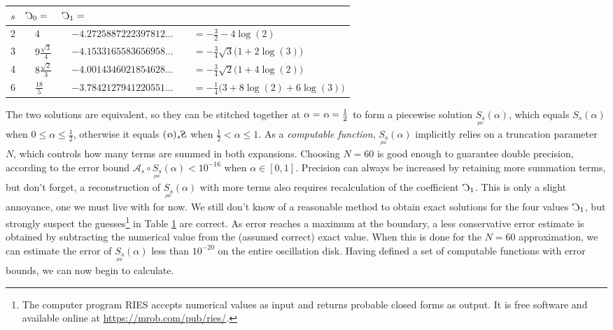 \documentclass[nofootinbib,preprint]{revtex4-1}
\newcommand{\rev}[1]{\text{\reflectbox{$#1$}}}
\begin{document}
\begin{table}[t]
\begin{center}
\label{tab:InitDat}
\begin{tabularx}{0.9 \textwidth}{ c |  c l | c l  c l }
\hline \hline
 \;\;\;$s$\;\;\;&\multicolumn{2}{l|}{ \; $\rev{C}_0=$} & \multicolumn{2}{l}{\; $\rev{C}_1=$} 
 &  \\
\hline
2 &\;\;\;\;& $4$ & \;\;\;\; 
         & $-4.2725887222397812\ldots$ &  & $ = -\frac{3}{2} - 4 \log(2)$   \\
3 &\;\;\;& $9\frac{\sqrt{3}}{4}$ \hspace{0.5cm} & \;\;\; 
         & $-4.1533165583656958\ldots$ &  & $ = -\frac{3}{4}\sqrt{3}\big(1+2\log(3)\big)$   \\
4 &\;\;\;& $8\frac{\sqrt{2}}{3}$ & \;\;\; 
         & $-4.0014346021854628\ldots$ &  & $ = -\frac{3}{4}\sqrt{2}\big(1+4\log(2)\big)$   \\
6 &\;\;\;& $\frac{18}{5}$ & \;\;\; 
         & $-3.7842127941220551\ldots$ & \;\;\;\; & $ = - \frac{1}{4}\big(3+8\log(2)+6\log(3)\big)$
\\ \hline
\end{tabularx}
\end{center}
\end{table}

The two solutions are equivalent, so they can be stitched together at $\alpha=\rev{\alpha}=\frac{1}{2}$ 
to form a piecewise solution $\underset{^{pw}}{S_s}(\alpha)$, which equals $S_s(\alpha)$ 
when $0 \le \alpha \le \frac{1}{2}$, otherwise it equals $\rev{S_s(\alpha)}$ when 
$\frac{1}{2}<\alpha \le 1$. As a \textit{computable function}, $\underset{^{pw}}{S_s}(\alpha)$ 
implicitly relies on a truncation parameter $N$, which controls how many terms are summed in 
both expansions. Choosing $N=60$ is good enough to guarantee double precision, according to the error bound
$\mathcal{A}_s \circ \underset{^{pw}}{S_s}(\alpha) < 10^{-16}$ when $\alpha \in [0,1]$.
Precision can always be increased by retaining more summation terms, but don't forget,  
a reconstruction of $\underset{^{pw}}{S_s}(\alpha)$ with more terms also requires 
recalculation of the coefficient $\rev{C}_1$. This is only a slight annoyance, one we 
must live with for now. We still don't know of a reasonable method to obtain exact solutions 
for the four values $\rev{C}_1$, but strongly suspect the guesses\footnote{The computer program RIES
accepts numerical values as input and returns probable closed forms as output. It is 
free software and available online at  \href{https://mrob.com/pub/ries/}{https://mrob.com/pub/ries/}.}
in Table \ref{tab:InitDat} are correct. As error reaches a maximum at the boundary, a less 
conservative error estimate is obtained by subtracting the numerical value from the (assumed 
correct) exact value. When this is done for the $N=60$ approximation, we can estimate 
the error of $\underset{^{pw}}{S_s}(\alpha)$ less than $10^{-20}$ on the entire 
oscillation disk.  Having defined a set of computable functions with error bounds, we 
can now begin to calculate. 
\end{document}
